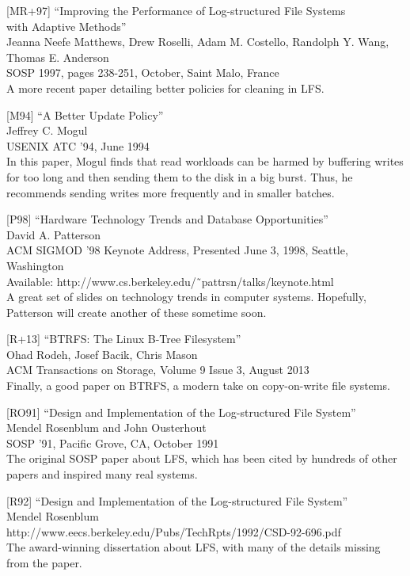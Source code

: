 {[}MR+97{]} ``Improving the Performance of Log-structured File Systems\\
with Adaptive Methods''\\
Jeanna Neefe Matthews, Drew Roselli, Adam M. Costello, Randolph Y. Wang,
Thomas E. Anderson\\
SOSP 1997, pages 238-251, October, Saint Malo, France\\
A more recent paper detailing better policies for cleaning in LFS.

{[}M94{]} ``A Better Update Policy''\\
Jeffrey C. Mogul\\
USENIX ATC '94, June 1994\\
In this paper, Mogul finds that read workloads can be harmed by
buffering writes for too long and then sending them to the disk in a big
burst. Thus, he recommends sending writes more frequently and in smaller
batches.

{[}P98{]} ``Hardware Technology Trends and Database Opportunities''\\
David A. Patterson\\
ACM SIGMOD '98 Keynote Address, Presented June 3, 1998, Seattle,
Washington\\
Available: http://www.cs.berkeley.edu/˜pattrsn/talks/keynote.html\\
A great set of slides on technology trends in computer systems.
Hopefully, Patterson will create another of these sometime soon.

{[}R+13{]} ``BTRFS: The Linux B-Tree Filesystem''\\
Ohad Rodeh, Josef Bacik, Chris Mason\\
ACM Transactions on Storage, Volume 9 Issue 3, August 2013\\
Finally, a good paper on BTRFS, a modern take on copy-on-write file
systems.

{[}RO91{]} ``Design and Implementation of the Log-structured File
System''\\
Mendel Rosenblum and John Ousterhout\\
SOSP '91, Pacific Grove, CA, October 1991\\
The original SOSP paper about LFS, which has been cited by hundreds of
other papers and inspired many real systems.

{[}R92{]} ``Design and Implementation of the Log-structured File
System''\\
Mendel Rosenblum\\
http://www.eecs.berkeley.edu/Pubs/TechRpts/1992/CSD-92-696.pdf\\
The award-winning dissertation about LFS, with many of the details
missing from the paper.

